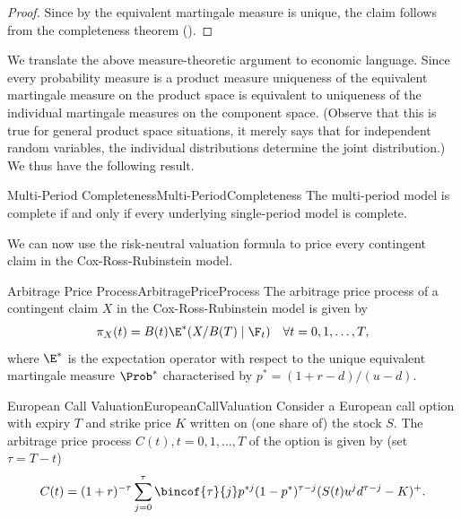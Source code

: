 \begin{proof}
	Since by  the equivalent martingale measure is unique, the claim follows from the completeness theorem ().
\end{proof}

We translate the above measure-theoretic argument to economic language. Since every probability measure is a product measure uniqueness of the equivalent martingale measure on the product space is equivalent to uniqueness of the individual martingale measures on the component space. (Observe that this is true for general product space situations, it merely says that for independent random variables, the individual distributions determine the joint distribution.) We thus have the following result.

\begin{cor}{Multi-Period Completeness}{Multi-PeriodCompleteness}
	The multi-period model is complete if and only if every underlying single-period model is complete.
\end{cor}

We can now use the risk-neutral valuation formula to price every contingent claim in the Cox-Ross-Rubinstein model.

\begin{prop}{Arbitrage Price Process}{ArbitragePriceProcess}
	The arbitrage price process of a contingent claim \(X\) in the Cox-Ross-Rubinstein model is given by
	\[
		\pi_X(t) = B(t)\E^* (X/B(T) \mid \F_t) \quad \forall t = 0, 1, \dots, T,
	\]
	where \(\E^*\) is the expectation operator with respect to the unique equivalent martingale measure \(\Prob^*\) characterised by \(p^* = (1+r-d)/(u-d)\).
\end{prop}

\begin{cor}{European Call Valuation}{EuropeanCallValuation}
	Consider a European call option with expiry \(T\) and strike price \(K\) written on (one share of) the stock \(S\). The arbitrage price process \(C(t), t=0,1,\dots,T\) of the option is given by (set \(\tau = T-t\))
	\begin{equation} \label{eq:EuropeanCallValuation}
		C(t) = (1+r)^{-\tau} \sum_{j=0}^{\tau} \bincof{\tau}{j} p^{*j}(1-p^*)^{\tau-j}(S(t)u^j d^{\tau-j} - K)^+.
	\end{equation}
\end{cor}

